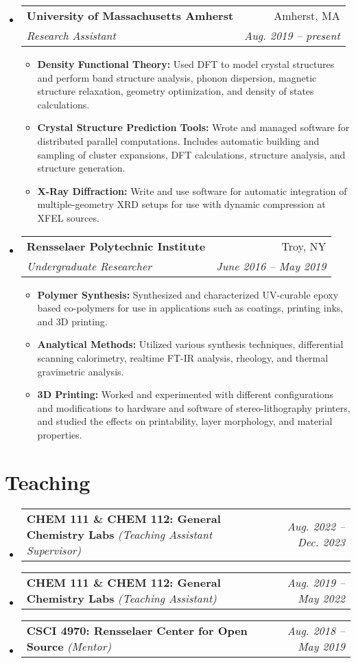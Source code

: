 \documentclass[letterpaper,11pt]{article}
\makeatletter
\newcommand{\positionItem}[4]{
    \vspace{-1pt}\item[]
    \begin{tabular*}{\textwidth}{l@{\extracolsep{\fill}}r}
        \textbf{#1} & #2 \\
        \textit{\footnotesize #3} & \textit{\footnotesize #4} \\
    \end{tabular*}\vspace{-8pt}
}
\newcommand{\positionSubItem}[2]{
    \scriptsize \item \textbf{#1} {#2 \vspace{-2pt}}
}
\newcommand{\teaching}[3]{
    \vspace{-2pt}
    \scriptsize
    \item[]
    \begin{tabularx}{\textwidth}{l@{\extracolsep{\fill}}r}
        \textbf{#1} \textit{(#2)} & \textit{#3} \\
    \end{tabularx}\vspace{-12pt}
}
\makeatother
\begin{document}
    \begin{itemize}[leftmargin=0pt]
        \positionItem
        {University of Massachusetts Amherst}{Amherst, MA}
        {Research Assistant}{Aug. 2019 -- present}
        \begin{itemize}
            \positionSubItem{Density Functional Theory:}
                {Used DFT to model crystal structures and perform band structure analysis, phonon dispersion, magnetic structure relaxation, geometry optimization, and density of states calculations.}
            \positionSubItem{Crystal Structure Prediction Tools:}
                {Wrote and managed software for distributed parallel computations. Includes automatic building and sampling of cluster expansions, DFT calculations, structure analysis, and structure generation.}
            \positionSubItem{X-Ray Diffraction:}
                {Write and use software for automatic integration of multiple-geometry XRD setups for use with dynamic compression at XFEL sources.}
        \end{itemize}
    \end{itemize}
    
    \vspace{-10pt}
    
    \begin{itemize}[leftmargin=0pt]
        \positionItem
        {Rensselaer Polytechnic Institute}{Troy, NY}
        {Undergraduate Researcher}{June 2016 -- May 2019}
        \begin{itemize}
            \positionSubItem{Polymer Synthesis:}
                {Synthesized and characterized UV-curable epoxy based co-polymers for use in applications such as coatings, printing inks, and 3D printing.}
            \positionSubItem{Analytical Methods:}
                {Utilized various synthesis techniques, differential scanning calorimetry, realtime FT-IR analysis, rheology, and thermal gravimetric analysis.}
            \positionSubItem{3D Printing:}
                {Worked and experimented with different configurations and modifications to hardware and software of stereo-lithography printers, and studied the effects on printability, layer morphology, and material properties.}
        \end{itemize}
    \end{itemize}

\section{Teaching}
    \vspace{4pt}
    \begin{itemize}[leftmargin=0pt]
        \teaching{CHEM 111 \& CHEM 112: General Chemistry Labs}{Teaching Assistant Supervisor}{Aug. 2022 -- Dec. 2023}
        \teaching{CHEM 111 \& CHEM 112: General Chemistry Labs}{Teaching Assistant}{Aug. 2019 -- May 2022}
        \teaching{CSCI 4970: Rensselaer Center for Open Source}{Mentor}{Aug. 2018 -- May 2019}
    \end{itemize}
\end{document}
